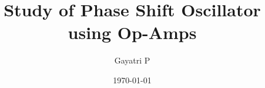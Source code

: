 \documentclass[reprint,amsmath,amssymb,aps]{revtex4-2}
\begin{document}
    \title{Study of Phase Shift Oscillator using Op-Amps}

    \author{Gayatri P}
    \date{\today}

    
    \maketitle

    
    
    
    

    \appendix

    

    
    \nocite{*}
\end{document}
